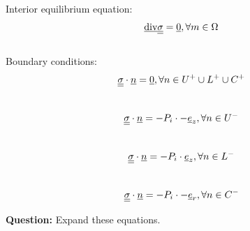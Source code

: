 \documentclass[letter,12pt]{article}
\begin{document}
Interior equilibrium equation: 
\begin{equation}
\underline{\text{div}} \underline{\underline{\sigma}} = \underline{0}, \forall m \in \Omega
\end{equation} \\

Boundary conditions: 
\begin{equation}
\underline{\underline{\sigma}} \cdot \underline{n} = \underline{0}, \forall n \in U^{+} \cup L^{+} \cup C^{+}
\end{equation} \\

\begin{equation}
\underline{\underline{\sigma}} \cdot \underline{n} = -P_i \cdot -\underline{e}_{z}, \forall n \in U^{-}
\end{equation} \\

\begin{equation}
\underline{\underline{\sigma}} \cdot \underline{n} = -P_i \cdot \underline{e}_{z}, \forall n \in L^{-}
\end{equation} \\

\begin{equation}
\underline{\underline{\sigma}} \cdot \underline{n} = -P_i \cdot -\underline{e}_{r}, \forall n \in C^{-}
\end{equation}

 \noindent \textbf{Question:} Expand these equations. \\
 
\end{document}
